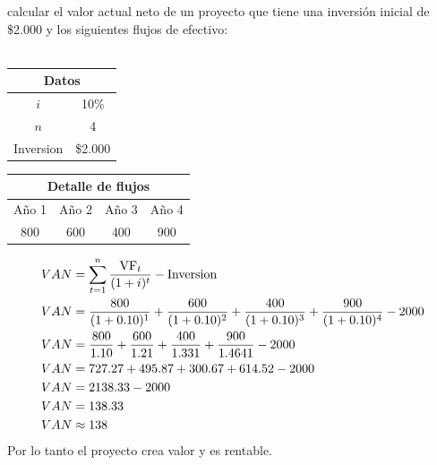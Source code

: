 \documentclass{templateNote}
\begin{document}
\begin{tcolorbox}[colback=blue!10!white,colframe=blue!60!black,title=Ejemplo]
    \noindent calcular el valor actual neto de un proyecto que tiene una inversión inicial de \$2.000 y los siguientes flujos de efectivo: \\\\
    \begin{minipage}{0.4\textwidth}
        \centering
        \begin{tabular}{|c|c|}
            \hline
            \multicolumn{2}{|c|}{\textbf{Datos}} \\ \hline
            $i$ & 10\% \\ \hline
            $n$ & 4 \\ \hline
            Inversion & \$2.000 \\ \hline
        \end{tabular}
    \end{minipage}
    \begin{minipage}{0.5\textwidth}
        \centering
        \begin{tabular}{|c|c|c|c|}
            \hline
            \multicolumn{4}{|c|}{\textbf{Detalle de flujos}} \\ \hline
            Año 1 & Año 2 & Año 3 & Año 4 \\ \hline
            800 & 600 & 400 & 900 \\ \hline
        \end{tabular}
    \end{minipage}

    \begin{align*}
        VAN &= \sum_{t=1}^{n} \frac{{\textnormal{VF}}_t}{(1 + i)^t} - \textnormal{Inversion}\\
        VAN &= \frac{800}{(1 + 0.10)^1} + \frac{600}{(1 + 0.10)^2} + \frac{400}{(1 + 0.10)^3} + \frac{900}{(1 + 0.10)^4} - 2000\\
        VAN &= \frac{800}{1.10} + \frac{600}{1.21} + \frac{400}{1.331} + \frac{900}{1.4641} - 2000\\
        VAN &= 727.27 + 495.87 + 300.67 + 614.52 - 2000\\
        VAN &= 2138.33 - 2000\\
        VAN &= 138.33 \\
        VAN &\approx 138
    \end{align*}
    \center Por lo tanto el proyecto crea valor y es rentable.
\end{tcolorbox}    
\end{document}
